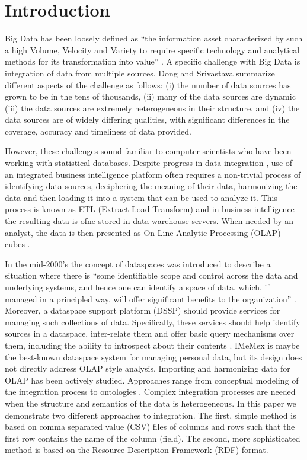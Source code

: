 \documentclass[USenglish,twocolumn]{article}
\begin{document}
 

\maketitle
\section{Introduction}


Big Data has been loosely defined as ``the information asset
characterized by such a high Volume, Velocity and Variety to require
specific technology and analytical methods for its transformation into
value'' \cite{DeM16}. A specific challenge with Big Data is integration of data from
multiple sources. Dong and Srivastava \cite{Don13} summarize different aspects of the
challenge as follows: (i) the number of data sources has grown to be in
the tens of thousands, (ii) many of the data sources are dynamic (iii)
the data sources are extremely heterogeneous in their structure, and
(iv) the data sources are of widely differing qualities, with
significant differences in the coverage, accuracy and timeliness of data
provided.

However, these challenges sound familiar to computer scientists who have
been working with statistical databases. Despite progress in data
integration \cite{Alo061}, use of an integrated business intelligence platform often
requires a non-trivial process of identifying data sources, deciphering
the meaning of their data, harmonizing the data and then loading it into
a system that can be used to analyze it. This process is known as ETL
(Extract-Load-Transform) \cite{Rah00} and in business intelligence the resulting data
is ofne stored in data warehouse servers. When needed by an analyst, the
data is then presented as On-Line Analytic Processing (OLAP) cubes \cite{Sur11}.

In the mid-2000's the concept of dataspaces was introduced to describe a
situation where there is ``some identifiable scope and control across
the data and underlying systems, and hence one can identify a space of
data, which, if managed in a principled way, will offer significant
benefits to the organization'' \cite{Mic05}. Moreover, a dataspace support platform
(DSSP) should provide services for managing such collections of data.
Specifically, these services should help identify sources in a
dataspace, inter-relate them and offer basic query mechanisms over them,
including the ability to introspect about their contents \cite{Alo061}. IMeMex \cite{Dit06} is
maybe the best-known dataspace system for managing personal data, but
its design does not directly address OLAP style analysis. Importing and
harmonizing data for OLAP has been actively studied. Approaches range
from conceptual modeling of the integration process to ontologies \cite{Nii09}.
Complex integration processes are needed when the structure and
semantics of the data is heterogeneous. In this paper we demonstrate two
different approaches to integration. The first, simple method is based
on comma separated value (CSV) files of columns and rows such that the
first row contains the name of the column (field). The second, more
sophisticated method is based on the Resource Description Framework
(RDF) format.
\end{document}
